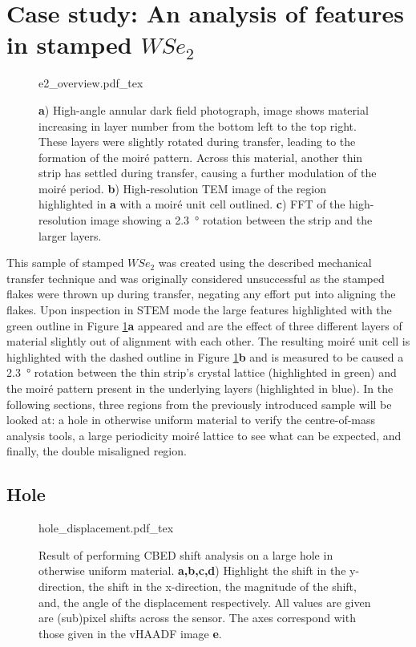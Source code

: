 \section{Case study: An analysis of features in stamped $WSe_2$}
\begin{figure}
    \centering
    \def\svgwidth{.95\linewidth}
    {e2_overview.pdf_tex}
    \caption{\textbf{a}) High-angle annular dark field photograph, image shows material increasing in layer number from the bottom left to the top right. These layers were slightly rotated during transfer, leading to the formation of the moiré pattern. Across this material, another thin strip has settled during transfer, causing a further modulation of the moiré period. \textbf{b}) High-resolution TEM image of the region highlighted in \textbf{a} with a moiré unit cell outlined. \textbf{c}) FFT of the high-resolution image showing a \SI{2.3}{\degree} rotation between the strip and the larger layers.}
    \label{fig:dub_moire}
\end{figure}

This sample of stamped $WSe_2$ was created using the described mechanical transfer technique and was originally considered unsuccessful as the stamped flakes were thrown up during transfer, negating any effort put into aligning the flakes. Upon inspection in STEM mode the large features highlighted with the green outline in Figure \ref{fig:dub_moire}\textbf{a} appeared and are the effect of three different layers of material slightly out of alignment with each other. The resulting moiré unit cell is highlighted with the dashed outline in Figure \ref{fig:dub_moire}\textbf{b} and is measured to be caused a \SI{2.3}{\degree} rotation between the thin strip's crystal lattice (highlighted in green) and the moiré pattern present in the underlying layers (highlighted in blue).
In the following sections, three regions from the previously introduced sample will be looked at: a hole in otherwise uniform material to verify the centre-of-mass analysis tools, a large periodicity moiré lattice to see what can be expected, and finally, the double misaligned region.

\subsection{Hole}

\begin{figure}
    \centering
    \def\svgwidth{.95\linewidth}
    {hole_displacement.pdf_tex}
    \caption{Result of performing CBED shift analysis on a large hole in otherwise uniform material. \textbf{a,b,c,d}) Highlight the shift in the y-direction, the shift in the x-direction, the magnitude of the shift, and, the angle of the displacement respectively. All values are given are (sub)pixel shifts across the sensor. The axes correspond with those given in the vHAADF image \textbf{e}.}
    \label{fig:hole_dis}
\end{figure}

